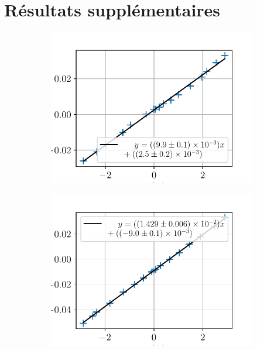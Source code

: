 \section{Résultats supplémentaires}
\label{sec:supp}

\begin{figure}{}
    \centering
    \begin{subfigure}{0.3\textwidth}
        \includegraphics[width=\linewidth]{figures/Ag_I.pdf}
        \caption{}
        \label{fig:Ag_I}
    \end{subfigure}%
    \begin{subfigure}{0.3\textwidth}
        \includegraphics[width=\linewidth]{figures/Cu_I.pdf}
        \caption{}
        \label{fig:Cu_I}

\end{subfigure}
\end{figure}
